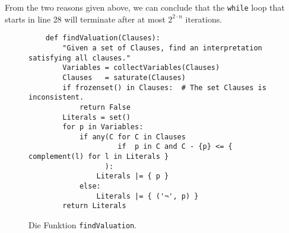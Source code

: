 From the two reasons given above, we can conclude that the \texttt{while} loop that starts in
line 28 will terminate after at most $2^{2 \cdot n}$ iterations.



\begin{figure}[!ht]
\centering
\begin{verbatim}
    def findValuation(Clauses):
        "Given a set of Clauses, find an interpretation satisfying all clauses."
        Variables = collectVariables(Clauses)
        Clauses   = saturate(Clauses)
        if frozenset() in Clauses:  # The set Clauses is inconsistent.
            return False
        Literals = set()
        for p in Variables:
            if any(C for C in Clauses 
                     if  p in C and C - {p} <= { complement(l) for l in Literals }
                  ):
                Literals |= { p }
            else:
                Literals |= { ('¬', p) }
        return Literals
\end{verbatim}
\vspace*{-0.3cm}
\caption{Die Funktion \texttt{findValuation}.}
\label{fig:Completeness.ipynb-3}
\end{figure}

\FloatBarrier

